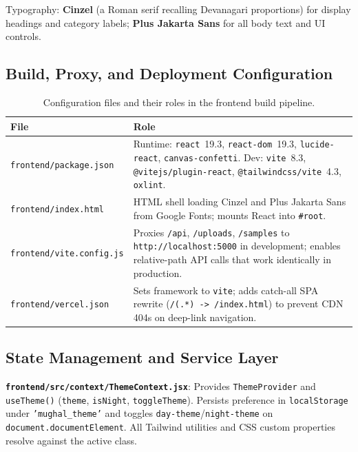 \documentclass[12pt, a4paper, twoside]{article}
\begin{document}
Typography: \textbf{Cinzel} (a Roman serif recalling Devanagari proportions) for display headings and category labels; \textbf{Plus Jakarta Sans} for all body text and UI controls.

\subsection{Build, Proxy, and Deployment Configuration}

\begin{table}[H]
  \centering
  \caption{Configuration files and their roles in the frontend build pipeline.}
  \label{tab:config}
  \begin{tabularx}{\linewidth}{L{3.5cm} X}
    \toprule
    \textbf{File} & \textbf{Role}\\
    \midrule
    \texttt{frontend/package.json}     & Runtime: \texttt{react}~19.3, \texttt{react-dom}~19.3, \texttt{lucide-react}, \texttt{canvas-confetti}. Dev: \texttt{vite}~8.3, \texttt{@vitejs/plugin-react}, \texttt{@tailwindcss/vite}~4.3, \texttt{oxlint}.\\
    \texttt{frontend/index.html}       & HTML shell loading Cinzel and Plus Jakarta Sans from Google Fonts; mounts React into \texttt{\#root}.\\
    \texttt{frontend/vite.config.js}   & Proxies \texttt{/api}, \texttt{/uploads}, \texttt{/samples} to \texttt{http://localhost:5000} in development; enables relative-path API calls that work identically in production.\\
    \texttt{frontend/vercel.json}      & Sets framework to \texttt{vite}; adds catch-all SPA rewrite (\texttt{/(.*) -> /index.html}) to prevent CDN 404s on deep-link navigation.\\
    \bottomrule
  \end{tabularx}
\end{table}

\subsection{State Management and Service Layer}

\textbf{\texttt{frontend/src/context/ThemeContext.jsx}}: Provides \texttt{ThemeProvider} and \texttt{useTheme()} (\texttt{theme}, \texttt{isNight}, \texttt{toggleTheme}). Persists preference in \texttt{localStorage} under \texttt{'mughal\_theme'} and toggles \texttt{day-theme}/\texttt{night-theme} on \texttt{document.documentElement}. All Tailwind utilities and CSS custom properties resolve against the active class.
\end{document}
